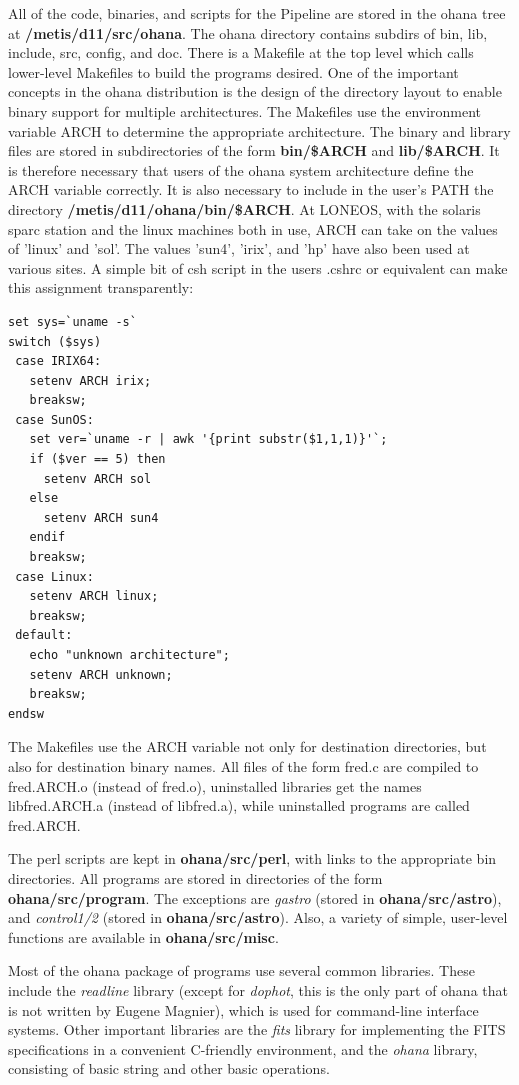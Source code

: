 \documentclass{article}
\newcommand\pr{\em}                   %
\newcommand\ff{\bf}                   %
\begin{document}
All of the code, binaries, and scripts for the Pipeline are stored in
the ohana tree at {\ff /metis/d11/src/ohana}.  The ohana directory contains
subdirs of bin, lib, include, src, config, and doc.  There is a
Makefile at the top level which calls lower-level Makefiles to build
the programs desired.  One of the important concepts in the ohana
distribution is the design of the directory layout to enable binary
support for multiple architectures.  The Makefiles use the environment
variable ARCH to determine the appropriate architecture.  The binary
and library files are stored in subdirectories of the form {\ff bin/\$ARCH}
and {\ff lib/\$ARCH}.  It is therefore necessary that users of the ohana
system architecture define the ARCH variable correctly.  It is also
necessary to include in the user's PATH the directory
{\ff /metis/d11/ohana/bin/\$ARCH}.  At LONEOS,
with the solaris sparc station and the linux machines both in use,
ARCH can take on the values of 'linux' and 'sol'.  The values 'sun4',
'irix', and 'hp' have also been used at various sites.  A simple bit
of csh script in the users .cshrc or equivalent can make this
assignment transparently:

\begin{verbatim}
set sys=`uname -s` 
switch ($sys)
 case IRIX64:
   setenv ARCH irix;
   breaksw;
 case SunOS:
   set ver=`uname -r | awk '{print substr($1,1,1)}'`;
   if ($ver == 5) then
     setenv ARCH sol
   else 
     setenv ARCH sun4
   endif
   breaksw;
 case Linux:
   setenv ARCH linux;
   breaksw;
 default:
   echo "unknown architecture";
   setenv ARCH unknown;
   breaksw;
endsw
\end{verbatim}

The Makefiles use the ARCH variable not only for destination
directories, but also for destination binary names.  All files of the
form fred.c are compiled to fred.ARCH.o (instead of fred.o), 
uninstalled libraries get the names libfred.ARCH.a (instead of
libfred.a), while uninstalled programs are called fred.ARCH.  

The perl scripts are kept in {\ff ohana/src/perl}, with links to the
appropriate bin directories.  All programs are stored in directories
of the form {\ff ohana/src/program}.  The exceptions are {\pr gastro}
(stored in {\ff ohana/src/astro}), and {\pr control1/2} (stored in
{\ff ohana/src/astro}).  Also, a variety of simple, user-level
functions are available in {\ff ohana/src/misc}.

Most of the ohana package of programs use several common libraries.
These include the {\pr readline} library (except for {\pr dophot},
this is the only part of ohana that is not written by Eugene Magnier),
which is used for command-line interface systems.  Other important
libraries are the {\pr fits} library for implementing the FITS
specifications in a convenient C-friendly environment, and the {\pr
ohana} library, consisting of basic string and other basic operations.
\end{document}
